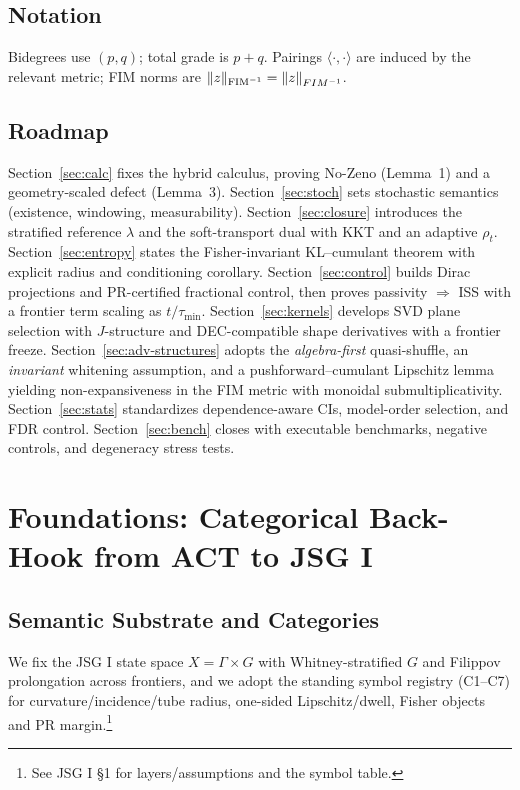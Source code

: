 \documentclass[10pt]{article}
\newcommand{\FIM}{\mathrm{FIM}}
\newcommand{\normFIM}[1]{\left\|#1\right\|_{\\FIM^{-1}}}
\begin{document}
\subsection*{Notation}
Bidegrees use $(p,q)$; total grade is $p+q$. Pairings $\langle\cdot,\cdot\rangle$ are induced by the relevant metric; FIM norms are $\|z\|_{\FIM^{-1}}=\normFIM{z}$.

\subsection*{Roadmap}
Section~\ref{sec:calc} fixes the hybrid calculus, proving No-Zeno (Lemma~1) and a geometry-scaled defect (Lemma~3). Section~\ref{sec:stoch} sets stochastic semantics (existence, windowing, measurability). Section~\ref{sec:closure} introduces the stratified reference $\lambda$ and the soft-transport dual with KKT and an adaptive $\rho_t$. Section~\ref{sec:entropy} states the Fisher-invariant KL–cumulant theorem with explicit radius and conditioning corollary. Section~\ref{sec:control} builds Dirac projections and PR-certified fractional control, then proves passivity $\Rightarrow$ ISS with a frontier term scaling as $t/\tau_{\min}$. Section~\ref{sec:kernels} develops SVD plane selection with $J$-structure and DEC-compatible shape derivatives with a frontier freeze. Section~\ref{sec:adv-structures} adopts the \emph{algebra-first} quasi-shuffle, an \emph{invariant} whitening assumption, and a pushforward–cumulant Lipschitz lemma yielding non-expansiveness in the FIM metric with monoidal submultiplicativity. Section~\ref{sec:stats} standardizes dependence-aware CIs, model-order selection, and FDR control. Section~\ref{sec:bench} closes with executable benchmarks, negative controls, and degeneracy stress tests.

\section{Foundations: Categorical Back-Hook from ACT to JSG I}

\subsection{Semantic Substrate and Categories}
We fix the JSG I state space $X=\Gamma\times G$ with Whitney-stratified $G$ and Filippov prolongation across frontiers, and we adopt the standing symbol registry (C1–C7) for curvature/incidence/tube radius, one-sided Lipschitz/dwell, Fisher objects and PR margin.\footnote{See JSG I §1 for layers/assumptions and the symbol table.}
\end{document}
